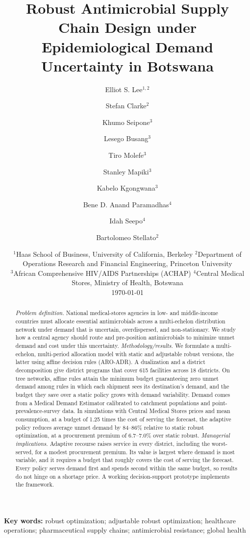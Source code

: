 \documentclass[11pt]{article}
\title{\textbf{Robust Antimicrobial Supply Chain Design under\\ Epidemiological Demand Uncertainty in Botswana}}
\author{}
\date{}
\author{%
Elliot S. Lee$^{1,2}$ \and
Stefan Clarke$^{2}$ \and
Khumo Seipone$^{3}$ \and
Lesego Busang$^{3}$ \and
Tiro Molefe$^{3}$ \and
Stanley Mapiki$^{3}$ \and
Kabelo Kgongwana$^{3}$ \and
Bene D. Anand Paramadhas$^{4}$ \and
Idah Seepo$^{4}$ \and
Bartolomeo Stellato$^{2}$
}
\date{%
\small
$^{1}$Haas School of Business, University of California, Berkeley \quad
$^{2}$Department of Operations Research and Financial Engineering, Princeton University\\
$^{3}$African Comprehensive HIV/AIDS Partnerships (ACHAP) \quad
$^{4}$Central Medical Stores, Ministry of Health, Botswana\\[1ex]
\today
}
\begin{document}
\maketitle

\begin{abstract}
\noindent
\textit{Problem definition.}
National medical-stores agencies in low- and middle-income countries must allocate essential antimicrobials across a multi-echelon distribution network under demand that is uncertain, overdispersed, and non-stationary.
We study how a central agency should route and pre-position antimicrobials to minimize unmet demand and cost under this uncertainty.
\noindent
\textit{Methodology/results.}
We formulate a multi-echelon, multi-period allocation model with static and adjustable robust versions, the latter using affine decision rules (ARO-ADR).
A dualization and a district decomposition give district programs that cover 615 facilities across 18 districts.
On tree networks, affine rules attain the minimum budget guaranteeing zero unmet demand among rules in which each shipment sees its destination's demand, and the budget they save over a static policy grows with demand variability.
Demand comes from a Medical Demand Estimator calibrated to catchment populations and point-prevalence-survey data.
In simulations with Central Medical Stores prices and mean consumption, at a budget of 1.25 times the cost of serving the forecast, the adaptive policy reduces average unmet demand by 84--86\% relative to static robust optimization, at a procurement premium of 6.7--7.0\% over static robust.
\noindent
\textit{Managerial implications.}
Adaptive recourse raises service in every district, including the worst-served, for a modest procurement premium.
Its value is largest where demand is most variable, and it requires a budget that roughly covers the cost of serving the forecast.
Every policy serves demand first and spends second within the same budget, so results do not hinge on a shortage price.
A working decision-support prototype implements the framework.
\end{abstract}

\bigskip

\noindent\textbf{Key words:} robust optimization; adjustable robust optimization; healthcare operations; pharmaceutical supply chains; antimicrobial resistance; global health

\clearpage

\end{document}
